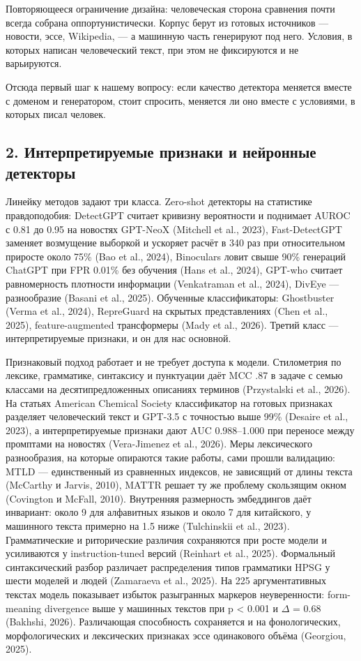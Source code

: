 \documentclass[11pt,a4paper]{article}
\renewcommand{\_}{\textunderscore\allowbreak}
\begin{document}
Повторяющееся ограничение дизайна: человеческая сторона сравнения почти всегда
собрана оппортунистически. Корпус берут из готовых источников — новости, эссе,
Wikipedia, — а машинную часть генерируют под него. Условия, в которых написан
человеческий текст, при этом не фиксируются и не варьируются.

Отсюда первый шаг к нашему вопросу: если качество детектора меняется вместе с
доменом и генератором, стоит спросить, меняется ли оно вместе с условиями, в
которых писал человек.

\subsection{2. Интерпретируемые признаки и нейронные детекторы}

Линейку методов задают три класса. Zero-shot детекторы на статистике
правдоподобия: DetectGPT считает кривизну вероятности и поднимает AUROC с 0.81 до
0.95 на новостях GPT-NeoX (Mitchell et al., 2023), Fast-DetectGPT заменяет возмущение выборкой и
ускоряет расчёт в 340 раз при относительном приросте около 75\% (Bao et al., 2024), Binoculars
ловит свыше 90\% генераций ChatGPT при FPR 0.01\% без обучения (Hans et al., 2024), GPT-who
считает равномерность плотности информации (Venkatraman et al., 2024), DivEye — разнообразие (Basani et al., 2025).
Обученные классификаторы: Ghostbuster (Verma et al., 2024), RepreGuard на скрытых
представлениях (Chen et al., 2025), feature-augmented трансформеры (Mady et al., 2026). Третий класс —
интерпретируемые признаки, и он для нас основной.

Признаковый подход работает и не требует доступа к модели. Стилометрия по
лексике, грамматике, синтаксису и пунктуации даёт MCC .87 в задаче с семью
классами на десятипредложенных описаниях терминов (Przystalski et al., 2026). На статьях
American Chemical Society классификатор на готовых признаках разделяет
человеческий текст и GPT-3.5 с точностью выше 99\% (Desaire et al., 2023), а интерпретируемые
признаки дают AUC 0.988–1.000 при переносе между промптами на новостях (Vera-Jimenez et al., 2026).
Меры лексического разнообразия, на которые опираются такие работы, сами прошли
валидацию: MTLD — единственный из сравненных индексов, не зависящий от длины
текста (McCarthy и Jarvis, 2010), MATTR решает ту же проблему скользящим окном (Covington и McFall, 2010). Внутренняя размерность
эмбеддингов даёт инвариант: около 9 для алфавитных языков и около 7 для
китайского, у машинного текста примерно на 1.5 ниже (Tulchinskii et al., 2023). Грамматические и
риторические различия сохраняются при росте модели и усиливаются у
instruction-tuned версий (Reinhart et al., 2025). Формальный синтаксический разбор различает
распределения типов грамматики HPSG у шести моделей и людей (Zamaraeva et al., 2025). На 225
аргументативных текстах модель показывает избыток разыгранных маркеров
неуверенности: form-meaning divergence выше у машинных текстов при p < 0.001 и
$\Delta$ = 0.68 (Bakhshi, 2026). Различающая способность сохраняется и на фонологических,
морфологических и лексических признаках эссе одинакового объёма (Georgiou, 2025).
\end{document}
